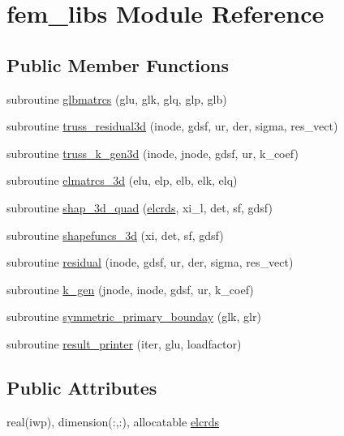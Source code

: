 \hypertarget{classfem__libs}{}\section{fem\+\_\+libs Module Reference}
\label{classfem__libs}
\subsection*{Public Member Functions}
\begin{DoxyCompactItemize}
\item 
subroutine \hyperlink{classfem__libs_a23f888b4cf756c6f798b9a2bf2097e3e}{glbmatrcs} (glu, glk, glq, glp, glb)
\item 
subroutine \hyperlink{classfem__libs_aee1cd1ef13025b0504e72bc48e786196}{truss\+\_\+residual3d} (inode, gdsf, ur, der, sigma, res\+\_\+vect)
\item 
subroutine \hyperlink{classfem__libs_a9cfdea9ee208b35a01aacea03241bf05}{truss\+\_\+k\+\_\+gen3d} (inode, jnode, gdsf, ur, k\+\_\+coef)
\item 
subroutine \hyperlink{classfem__libs_ab04d8c5372b45b49e592e69ea70d70bc}{elmatrcs\+\_\+3d} (elu, elp, elb, elk, elq)
\item 
subroutine \hyperlink{classfem__libs_a21fe571ae36abdb62cde54771aecf378}{shap\+\_\+3d\+\_\+quad} (\hyperlink{classfem__libs_a04e2b194321b1e0f6b833e4ac94cf8bd}{elcrds}, xi\+\_\+l, det, sf, gdsf)
\item 
subroutine \hyperlink{classfem__libs_aabc78d42940aafe6fddc66e23756ebe0}{shapefuncs\+\_\+3d} (xi, det, sf, gdsf)
\item 
subroutine \hyperlink{classfem__libs_ab8b19095be05992d83e94b831542c389}{residual} (inode, gdsf, ur, der, sigma, res\+\_\+vect)
\item 
subroutine \hyperlink{classfem__libs_a7046c70769df0e41e35774f11968fcb8}{k\+\_\+gen} (jnode, inode, gdsf, ur, k\+\_\+coef)
\item 
subroutine \hyperlink{classfem__libs_a231e44a22bcd8adc2c297666fc0771b2}{symmetric\+\_\+primary\+\_\+bounday} (glk, glr)
\item 
subroutine \hyperlink{classfem__libs_a3ab10bf4ab2d82ad3864b5dca8b2ce72}{result\+\_\+printer} (iter, glu, loadfactor)
\end{DoxyCompactItemize}
\subsection*{Public Attributes}
\begin{DoxyCompactItemize}
\item 
real(iwp), dimension(\+:,\+:), allocatable \hyperlink{classfem__libs_a04e2b194321b1e0f6b833e4ac94cf8bd}{elcrds}
\end{DoxyCompactItemize}


